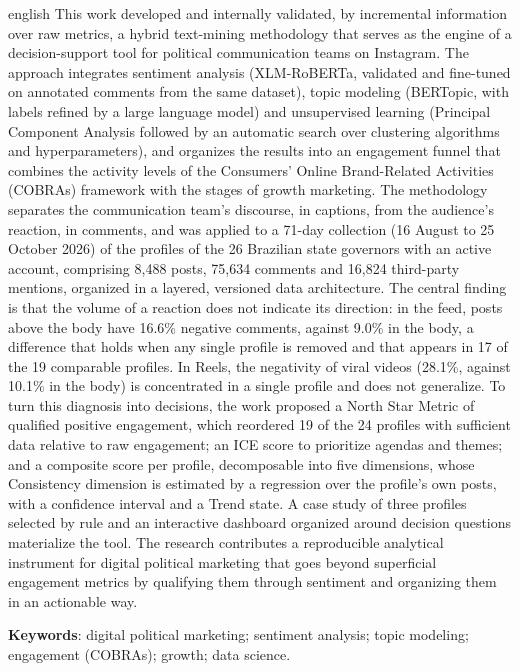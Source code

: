 \begin{resumo}[Abstract]
\begin{otherlanguage*}{english}
This work developed and internally validated, by incremental information over raw metrics, a hybrid text-mining methodology that serves as the engine of a decision-support tool for political communication teams on Instagram. The approach integrates sentiment analysis (XLM-RoBERTa, validated and fine-tuned on annotated comments from the same dataset), topic modeling (BERTopic, with labels refined by a large language model) and unsupervised learning (Principal Component Analysis followed by an automatic search over clustering algorithms and hyperparameters), and organizes the results into an engagement funnel that combines the activity levels of the Consumers' Online Brand-Related Activities (COBRAs) framework with the stages of growth marketing. The methodology separates the communication team's discourse, in captions, from the audience's reaction, in comments, and was applied to a 71-day collection (16 August to 25 October 2026) of the profiles of the 26 Brazilian state governors with an active account, comprising 8,488 posts, 75,634 comments and 16,824 third-party mentions, organized in a layered, versioned data architecture. The central finding is that the volume of a reaction does not indicate its direction: in the feed, posts above the body have 16.6\% negative comments, against 9.0\% in the body, a difference that holds when any single profile is removed and that appears in 17 of the 19 comparable profiles. In Reels, the negativity of viral videos (28.1\%, against 10.1\% in the body) is concentrated in a single profile and does not generalize. To turn this diagnosis into decisions, the work proposed a North Star Metric of qualified positive engagement, which reordered 19 of the 24 profiles with sufficient data relative to raw engagement; an ICE score to prioritize agendas and themes; and a composite score per profile, decomposable into five dimensions, whose Consistency dimension is estimated by a regression over the profile's own posts, with a confidence interval and a Trend state. A case study of three profiles selected by rule and an interactive dashboard organized around decision questions materialize the tool. The research contributes a reproducible analytical instrument for digital political marketing that goes beyond superficial engagement metrics by qualifying them through sentiment and organizing them in an actionable way.

\vspace{0.5cm}
\noindent
\textbf{Keywords}: digital political marketing; sentiment analysis; topic modeling; engagement (COBRAs); growth; data science.
\end{otherlanguage*}
\end{resumo}
